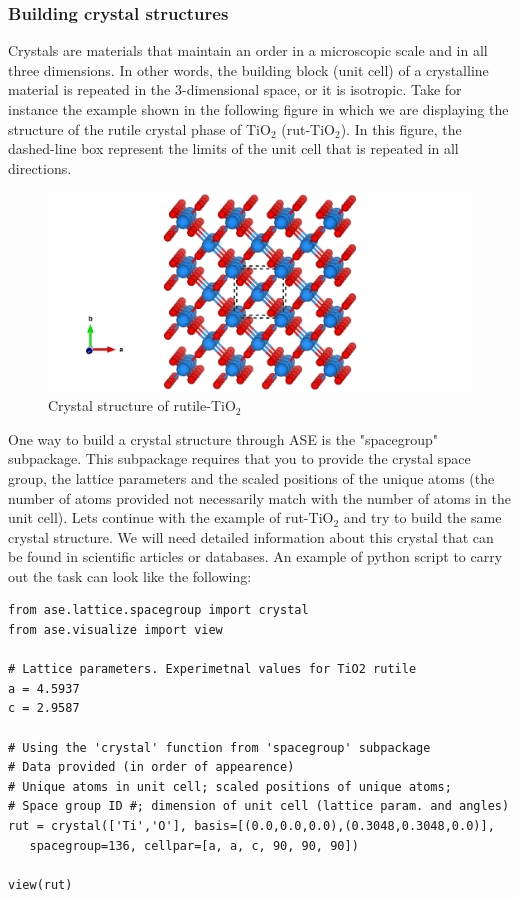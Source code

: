 \documentclass[11pt]{article}
\begin{document}
\subsubsection{Building crystal structures}
\label{sec-2-3-4}
Crystals are materials that maintain an order in a microscopic scale and in all three dimensions. In other words, the building block (unit cell) of a crystalline material is repeated in the 3-dimensional space, or it is isotropic. Take for instance the example shown in the following figure in which we are displaying the structure of the rutile crystal phase of TiO$_{\text{2}}$ (rut-TiO$_{\text{2}}$). In this figure, the dashed-line box represent the limits of the unit cell that is repeated in all directions.

\begin{figure}[htb]
\centering
\includegraphics[width=.9\linewidth]{./figures/rut-TiO2_ex.png}
\caption{Crystal structure of rutile-TiO$_{\text{2}}$}
\end{figure}

One way to build a crystal structure through ASE is the "spacegroup" subpackage. This subpackage requires that you to provide the crystal space group, the lattice parameters and the scaled positions of the unique atoms (the number of atoms provided not necessarily match with the number of atoms in the unit cell). Lets continue with the example of rut-TiO$_{\text{2}}$ and try to build the same crystal structure. We will need detailed information about this crystal that can be found in scientific articles or databases. An example of python script to carry out the task can look like the following:

\begin{verbatim}
from ase.lattice.spacegroup import crystal
from ase.visualize import view

# Lattice parameters. Experimetnal values for TiO2 rutile
a = 4.5937
c = 2.9587

# Using the 'crystal' function from 'spacegroup' subpackage
# Data provided (in order of appearence)
# Unique atoms in unit cell; scaled positions of unique atoms;
# Space group ID #; dimension of unit cell (lattice param. and angles)
rut = crystal(['Ti','O'], basis=[(0.0,0.0,0.0),(0.3048,0.3048,0.0)],
   spacegroup=136, cellpar=[a, a, c, 90, 90, 90])

view(rut)
\end{verbatim}
\end{document}
